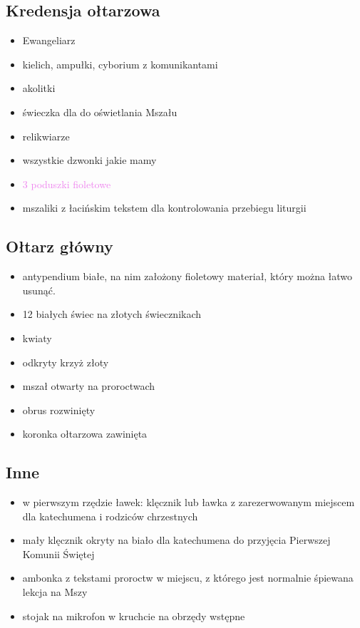 \subsection{Kredensja ołtarzowa}
\begin{itemize}
	\item Ewangeliarz
	\item kielich, ampułki, cyborium z komunikantami
	\item akolitki
	\item świeczka dla  do oświetlania Mszału
	\item relikwiarze
	\item wszystkie dzwonki jakie mamy
	\item \textcolor{violet}{3 poduszki fioletowe}
	\item mszaliki z łacińskim tekstem dla kontrolowania przebiegu liturgii
\end{itemize}

\subsection{Ołtarz główny}
\begin{itemize}
	\item antypendium \textcolor{black!50}{białe}, na nim założony
	      {\color{violet}fioletowy} materiał, który można łatwo usunąć.
	\item 12 białych świec na złotych świecznikach
	\item kwiaty
	\item odkryty krzyż złoty
	\item mszał otwarty na proroctwach
	\item obrus rozwinięty
	\item koronka ołtarzowa zawinięta
\end{itemize}

\subsection{Inne}
\begin{itemize}
	\item w pierwszym rzędzie ławek: klęcznik lub ławka z zarezerwowanym
	      miejscem dla katechumena i rodziców chrzestnych
	\item mały klęcznik okryty na biało dla katechumena do przyjęcia Pierwszej
	      Komunii Świętej
	\item ambonka z tekstami proroctw w miejscu, z którego jest
	      normalnie śpiewana lekcja na Mszy
	\item stojak na mikrofon w kruchcie na obrzędy wstępne
\end{itemize}


